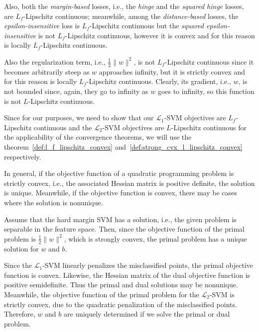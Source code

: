 
Also, both the \emph{margin-based} losses, i.e., the \emph{hinge} and the \emph{squared hinge} losses, are $L_f$-Lipschitz continuous; meanwhile, among the \emph{distance-based} losses, the \emph{epsilon-insensitive} loss is $L_f$-Lipschitz continuous but the \emph{squared epsilon-insensitive} is not $L_f$-Lipschitz continuous, however it is convex and for this reason is locally $L_f$-Lipschitz continuous. 

Also the regularization term, i.e., $\displaystyle \frac{1}{2} \| w \|^2$, is not $L_f$-Lipschitz continuous since it becomes arbitrarily steep as $w$ approaches infinity, but it is strictly convex and for this reason is locally $L_f$-Lipschitz continuous. Clearly, its gradient, i.e., $w$, is not bounded since, again, they go to infinity as $w$ goes to infinity, so this function is not $L$-Lipschitz continuous.

Since for our purposes, we need to show that our $\mathcal{L}_1$-SVM objectives are $L_f$-Lipschitz continuous and the $\mathcal{L}_2$-SVM objectives are $L$-Lipschitz continuous for the applicability of the convergence theorems, we will use the theorem~\ref{def:l_f_lipschitz_convex} and~\ref{def:strong_cvx_l_lipschitz_convex} respectively.

In general, if the objective function of a quadratic programming problem is strictly convex, i.e., the associated Hessian matrix is positive definite, the solution is unique. Meanwhile, if the objective function is convex, there may be cases where the solution is nonunique.

Assume that the hard margin SVM has a solution, i.e., the given problem is separable in the feature space. Then, since the objective function of the primal problem is $\displaystyle \frac{1}{2} \| w \|^2$, which is strongly convex, the primal problem has a unique solution for $w$ and $b$.

Since the $\mathcal{L}_1$-SVM linearly penalizes the misclassified points, the primal objective function is convex. Likewise, the Hessian matrix of the dual objective function is positive semidefinite. Thus the primal and dual solutions may be nonunique. Meanwhile, the objective function of the primal problem for the $\mathcal{L}_2$-SVM is strictly convex, due to the quadratic penalization of the misclassified points. Therefore, $w$ and $b$ are uniquely determined if we solve the primal or dual problem. 

